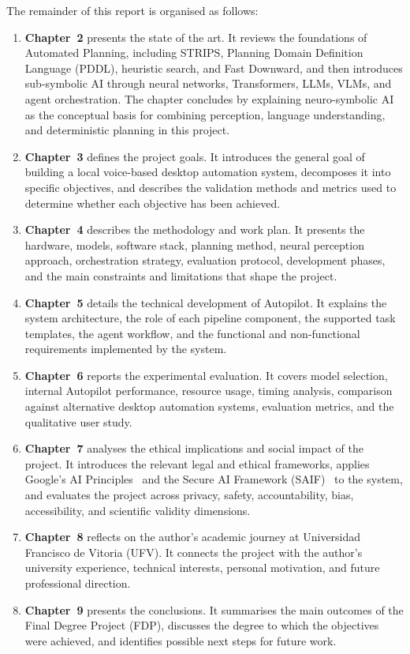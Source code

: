 The remainder of this report is organised as follows:
\begin{enumerate}
\item \textbf{Chapter~2} presents the state of the art. It reviews the foundations of Automated Planning, including STRIPS, 
Planning Domain Definition Language (PDDL), heuristic search, and Fast Downward, and then introduces sub-symbolic AI through neural networks, Transformers, LLMs, VLMs, and agent orchestration. The chapter concludes by explaining neuro-symbolic AI as the conceptual basis for combining perception, language understanding, and deterministic planning in this project.

\item \textbf{Chapter~3} defines the project goals. It introduces the general goal of building a local voice-based desktop automation system, decomposes it into specific objectives, and describes the validation methods and metrics used to determine whether each objective has been achieved.

\item \textbf{Chapter~4} describes the methodology and work plan. It presents the hardware, models, software stack, planning method, neural perception approach, orchestration strategy, evaluation protocol, development phases, and the main constraints and limitations that shape the project.

\item \textbf{Chapter~5} details the technical development of Autopilot. It explains the system architecture, the role of each pipeline component, the supported task templates, the agent workflow, and the functional and non-functional requirements implemented by the system.

\item \textbf{Chapter~6} reports the experimental evaluation. It covers model selection, internal Autopilot performance, resource usage, timing analysis, comparison against alternative desktop automation systems, evaluation metrics, and the qualitative user study.

\item \textbf{Chapter~7} analyses the ethical implications and social impact of the project. It introduces the relevant legal and ethical frameworks, applies Google's AI Principles~\cite{google_principles} and the Secure AI Framework (SAIF)~\cite{saif} to the system, and evaluates the project across privacy, safety, accountability, bias, accessibility, and scientific validity dimensions.

\item \textbf{Chapter~8} reflects on the author's academic journey at Universidad Francisco de Vitoria (UFV). It connects the project with the author's university experience, technical interests, personal motivation, and future professional direction.

\item \textbf{Chapter~9} presents the conclusions. It summarises the main outcomes of the Final Degree Project (FDP), discusses the degree to which the objectives were achieved, and identifies possible next steps for future work.
\end{enumerate}
